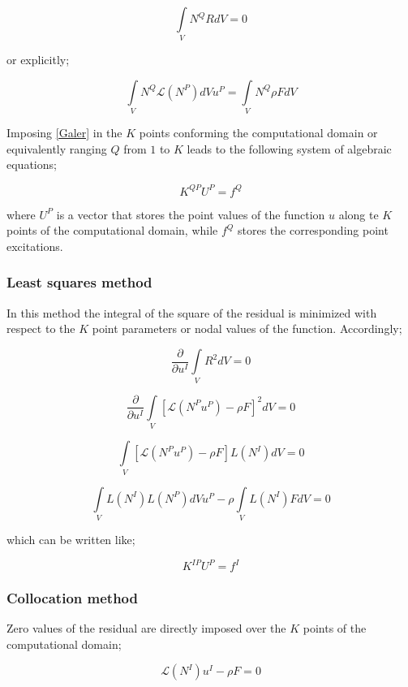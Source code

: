 \[\int\limits_V {{N^Q}RdV = 0} \]

or explicitly;

\begin{equation}
\int\limits_V {{N^Q} \mathcal{L} ({N^P})dV} {u^P} = \int\limits_V {{N^Q}\rho FdV}
\label{Galer}
\end{equation}



Imposing \cref{Galer} in the $K$ points conforming the computational domain or equivalently ranging $Q$ from $1$ to $K$ leads to the following system of algebraic equations;

\begin{equation}
{K^{QP}}{U^P} = {f^Q}
\label{DGaler}
\end{equation}

where $U^P$ is a vector that stores the point values of the function $u$ along te $K$ points of the computational domain, while $f^Q$ stores the corresponding point excitations.

\subsubsection{Least squares method}
In this method the integral of the square of the residual is minimized with respect to the $K$ point parameters or nodal values of the function. Accordingly;

\[\frac{\partial }{{\partial {u^I}}}\int\limits_V {{R^2}dV}  = 0\]

\[\frac{\partial }{{\partial {u^I}}}\int\limits_V {{{[\mathcal{L}({N^P}{u^P}) - \rho F]}^2}dV}  = 0\]

\[\int\limits_V {[\mathcal{L}({N^P}{u^P}) - \rho F]L({N^I})dV}  = 0\]

\[\int\limits_V {L({N^I})L({N^P})dV} {u^P} - \rho \int\limits_V {L({N^I})FdV = 0} \]

which can be written like;

\begin{equation}
{K^{IP}}{U^P} = {f^I}
\label{Dsquares}
\end{equation}

\subsubsection{Collocation method}
Zero values of the residual are directly imposed over the $K$ points of the computational domain;

\[\mathcal{L}({N^I}){u^I} - \rho F = 0\]

